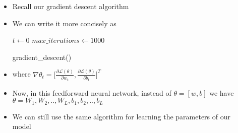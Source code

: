 \begin{frame}
  \begin{columns}
    \begin{overlayarea}{\textwidth}{\textheight}
      \makebox[\textwidth][c]{\usebox{\nncontent}}
    \end{overlayarea}

    \begin{overlayarea}{\textwidth}{\textheight}
      \begin{itemize}
        \justifying
        \item Recall our gradient descent algorithm
        \item {} {We can write it more concisely as}
             {
              \begin{algorithm}[H]
                \SetAlgoLined
                $t \leftarrow 0$\;
                $max\_iterations\leftarrow 1000$\;
                \caption{gradient\_descent()}
              \end{algorithm}
            }
        \item<5-> where $\nabla \theta_{t} = \big[\frac{\partial \mathscr{L}(\theta)}{\partial w_t}, \frac{\partial \mathscr{L}(\theta)}{\partial b_t}\big]^{T}$
        \item<6-> Now, in this feedforward neural network, instead of $\theta = [w, b]$ we have $\theta = {W_{1}, W_2, .., W_{L}, b_1, b_2, .., b_{L}}$
        \item<7-> We can still use the same algorithm for learning the parameters of our model

      \end{itemize}
    \end{overlayarea}

  \end{columns}
\end{frame}

